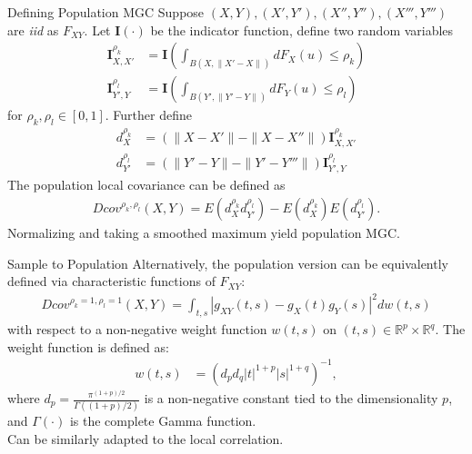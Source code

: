 \documentclass[mathserif,t]{beamer}
\newtheorem*{defi*}{Definition}
\providecommand{\mb}[1]{\boldsymbol{#1}}
\newcommand{\Mgc}{MGC}
\newcommand{\mbx}{X}
\newcommand{\mby}{Y}
\begin{document}
\begin{frame}{Defining Population \Mgc}
Suppose $(\mbx,\mby), (\mbx',\mby'), (\mbx'',\mby''), (\mbx''',\mby''')$ are \emph{iid} as $F_{XY}$. 
\pause
Let $\mb{I}(\cdot)$ be the indicator function, define two random variables
\begin{align*}
\mb{I}_{\mbx,\mbx'}^{\rho_{k}} &=\mb{I}(\int_{B(\mbx,\|\mbx'-\mbx\|)} dF_\mbx(u) \leq \rho_k)  \\
\mb{I}_{\mby',\mby}^{\rho_{l}} &=\mb{I}(\int_{B(\mby',\|\mby'-\mby\|)} dF_\mby(u) \leq \rho_l)
\end{align*}
for $\rho_{k},\rho_{l} \in [0,1]$.
\pause
Further define
\begin{align*}
d^{\rho_{k}}_{\mbx} &=(\| \mbx-\mbx' \| - \|\mbx-\mbx''\|) \mb{I}_{\mbx,\mbx'}^{\rho_{k}} \\
d^{\rho_{l}}_{\mby'} &=(\| \mby'-\mby \| - \|\mby'-\mby'''\|) \mb{I}_{\mby',\mby}^{\rho_{l}}
\end{align*}
\pause
The population local covariance can be defined as
\begin{align*}
Dcov^{\rho_{k}, \rho_{l}}(\mbx,\mby) = E(d^{\rho_{k}}_{\mbx} d^{\rho_{l}}_{\mby'}) - E(d^{\rho_{k}}_{\mbx}) E(d^{\rho_{l}}_{\mby'}).
\end{align*}
\pause
Normalizing and taking a smoothed maximum yield population \Mgc.
\end{frame}

\begin{frame}{Sample to Population}
\pause
Alternatively, the population version can be equivalently defined via characteristic functions of $F_{XY}$:
\begin{align*}
Dcov^{\rho_{k}=1, \rho_{l}=1}(\mbx,\mby) = \int_{t,s} |g_{XY}(t,s)-g_{X}(t)g_{Y}(s)|^2 dw(t,s)
\end{align*}
with respect to a non-negative weight function $w(t,s)$ on $(t,s) \in \mathbb{R}^{p} \times \mathbb{R}^{q}$. 
\pause 
The weight function is defined as:
\begin{align*}
		w(t,s) &=  (d_{p}d_{q} |t|^{1+p}|s|^{1+q})^{-1},
\end{align*}
where $d_{p}=\frac{\pi^{(1+p)/2}}{\Gamma((1+p)/2)}$ is a non-negative constant tied to the dimensionality $p$, and $\Gamma(\cdot)$ is the complete Gamma function.\\
\pause
\medskip
Can be similarly adapted to the local correlation.
\end{frame}
\end{document}
